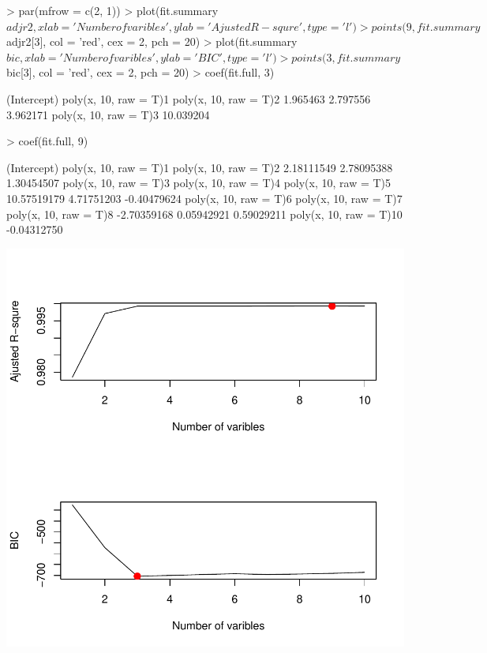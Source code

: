 \documentclass[a4paper]{article}
\begin{document}
\begin{Schunk}
\begin{Sinput}
> par(mfrow = c(2, 1))
> plot(fit.summary$adjr2, xlab = 'Number of varibles', ylab = 'Ajusted R-squre', type = 'l')
> points(9, fit.summary$adjr2[3], col = 'red', cex = 2, pch = 20)
> plot(fit.summary$bic, xlab = 'Number of varibles', ylab = 'BIC', type = 'l')
> points(3, fit.summary$bic[3], col = 'red', cex = 2, pch = 20)
> coef(fit.full, 3)
\end{Sinput}
\begin{Soutput}
          (Intercept) poly(x, 10, raw = T)1 poly(x, 10, raw = T)2 
             1.965463              2.797556              3.962171 
poly(x, 10, raw = T)3 
            10.039204 
\end{Soutput}
\begin{Sinput}
> coef(fit.full, 9)
\end{Sinput}
\begin{Soutput}
           (Intercept)  poly(x, 10, raw = T)1  poly(x, 10, raw = T)2 
            2.18111549             2.78095388             1.30454507 
 poly(x, 10, raw = T)3  poly(x, 10, raw = T)4  poly(x, 10, raw = T)5 
           10.57519179             4.71751203            -0.40479624 
 poly(x, 10, raw = T)6  poly(x, 10, raw = T)7  poly(x, 10, raw = T)8 
           -2.70359168             0.05942921             0.59029211 
poly(x, 10, raw = T)10 
           -0.04312750 
\end{Soutput}
\end{Schunk}
\includegraphics{modelselection-8cfig}
\end{document}

